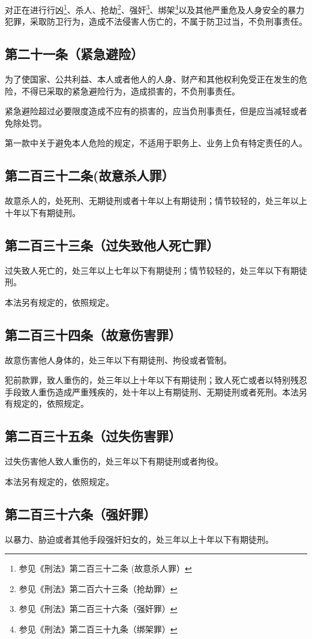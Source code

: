 \documentclass[utf-8,10pt]{ctexart}
\begin{document}
对正在进行行凶\footnote{参见《刑法》第二百三十二条 (故意杀人罪）}、杀人、抢劫\footnote{参见《刑法》第二百六十三条（抢劫罪）}、强奸\footnote{参见《刑法》第二百三十六条（强奸罪）}、绑架\footnote{参见《刑法》第二百三十九条（绑架罪）}以及其他严重危及人身安全的暴力犯罪，采取防卫行为，造成不法侵害人伤亡的，不属于防卫过当，不负刑事责任。
\subsection{第二十一条（紧急避险）}
为了使国家、公共利益、本人或者他人的人身、财产和其他权利免受正在发生的危险，不得已采取的紧急避险行为，造成损害的，不负刑事责任。

紧急避险超过必要限度造成不应有的损害的，应当负刑事责任，但是应当减轻或者免除处罚。

第一款中关于避免本人危险的规定，不适用于职务上、业务上负有特定责任的人。
\subsection{第二百三十二条(故意杀人罪）}
故意杀人的，处死刑、无期徒刑或者十年以上有期徒刑；情节较轻的，处三年以上十年以下有期徒刑。
\subsection{第二百三十三条（过失致他人死亡罪）}
过失致人死亡的，处三年以上七年以下有期徒刑；情节较轻的，处三年以下有期徒刑。

本法另有规定的，依照规定。
\subsection{第二百三十四条（故意伤害罪）}
故意伤害他人身体的，处三年以下有期徒刑、拘役或者管制。

犯前款罪，致人重伤的，处三年以上十年以下有期徒刑；致人死亡或者以特别残忍手段致人重伤造成严重残疾的，处十年以上有期徒刑、无期徒刑或者死刑。本法另有规定的，依照规定。
\subsection{第二百三十五条（过失伤害罪）}
过失伤害他人致人重伤的，处三年以下有期徒刑或者拘役。

本法另有规定的，依照规定。
\subsection{第二百三十六条（强奸罪）}
以暴力、胁迫或者其他手段强奸妇女的，处三年以上十年以下有期徒刑。
\end{document}
